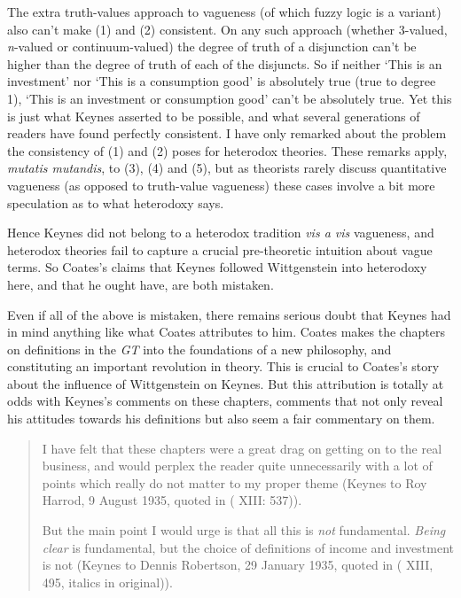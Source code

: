 \documentclass[
  10pt,
  letterpaper,
  DIV=11,
  numbers=noendperiod,
  twoside]{scrartcl}
\begin{document}
The extra truth-values approach to vagueness (of which fuzzy logic is a
variant) also can't make (1) and (2) consistent. On any such approach
(whether 3-valued, \emph{n}-valued or continuum-valued) the degree of
truth of a disjunction can't be higher than the degree of truth of each
of the disjuncts. So if neither `This is an investment' nor `This is a
consumption good' is absolutely true (true to degree 1), `This is an
investment or consumption good' can't be absolutely true. Yet this is
just what Keynes asserted to be possible, and what several generations
of readers have found perfectly consistent. I have only remarked about
the problem the consistency of (1) and (2) poses for heterodox theories.
These remarks apply, \emph{mutatis mutandis}, to (3), (4) and (5), but
as theorists rarely discuss quantitative vagueness (as opposed to
truth-value vagueness) these cases involve a bit more speculation as to
what heterodoxy says.

Hence Keynes did not belong to a heterodox tradition \emph{vis a vis}
vagueness, and heterodox theories fail to capture a crucial
pre-theoretic intuition about vague terms. So Coates's claims that
Keynes followed Wittgenstein into heterodoxy here, and that he ought
have, are both mistaken.

Even if all of the above is mistaken, there remains serious doubt that
Keynes had in mind anything like what Coates attributes to him. Coates
makes the chapters on definitions in the \emph{GT} into the foundations
of a new philosophy, and constituting an important revolution in theory.
This is crucial to Coates's story about the influence of Wittgenstein on
Keynes. But this attribution is totally at odds with Keynes's comments
on these chapters, comments that not only reveal his attitudes towards
his definitions but also seem a fair commentary on them.

\begin{quote}
I have felt that these chapters were a great drag on getting on to the
real business, and would perplex the reader quite unnecessarily with a
lot of points which really do not matter to my proper theme (Keynes to
Roy Harrod, 9 August 1935, quoted in ( XIII: 537)).

But the main point I would urge is that all this is \emph{not}
fundamental. \emph{Being clear} is fundamental, but the choice of
definitions of income and investment is not (Keynes to Dennis Robertson,
29 January 1935, quoted in ( XIII,
495, italics in original)).
\end{quote}
\end{document}
